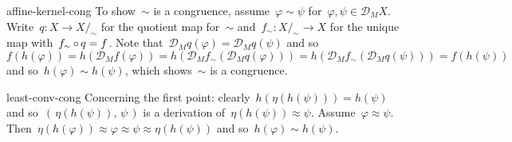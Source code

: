 \begin{solution}{affine-kernel-cong}%
To show~$\sim$ is a congruence,
    assume~$\varphi \sim \psi$ for~$\varphi,\psi \in \mathcal{D}_M X$.
Write~$q \colon X \to X/_\sim$
    for the quotient map for~$\sim$
        and~$f_\sim \colon X/_\sim \to X$ for
        the unique map with~$f_\sim \mathop{\circ} q =f$.
    Note that~$
    \mathcal{D}_M q (\varphi)
    = \mathcal{D}_M q (\psi)$ and so~$f(h(\varphi)) = 
    h (\mathcal{D}_M f(\varphi)) =
    h (\mathcal{D}_M f_\sim (\mathcal{D}_M q (\varphi))) =
    h (\mathcal{D}_M f_\sim (\mathcal{D}_M q (\psi))) =
    f(h(\psi))$
    and so~$h(\varphi) \sim h(\psi)$, which shows~$\sim$
    is a congruence.
\end{solution}
\begin{solution}{least-conv-cong}%
Concerning the first point:
clearly~$h (\eta(h(\psi))) = h(\psi)$
    and so~$(\, \eta(h(\psi)), \, \psi\,)$
    is a derivation of~$\eta(h(\psi)) \approx \psi$.
Assume~$\varphi \approx \psi$.
    Then~$\eta(h(\varphi)) \approx \varphi \approx \psi \approx \eta(h(\psi))$
        and so~$h(\varphi) \sim h(\psi)$.


\end{solution}
